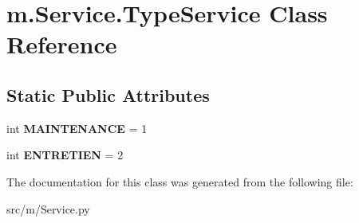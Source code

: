 \hypertarget{classm_1_1_service_1_1_type_service}{}\section{m.\+Service.\+Type\+Service Class Reference}
\label{classm_1_1_service_1_1_type_service}
\subsection*{Static Public Attributes}
\begin{DoxyCompactItemize}
\item 
\hypertarget{classm_1_1_service_1_1_type_service_a22b5cdd328cd557085510a3485ad9dfe}{}int {\bfseries M\+A\+I\+N\+T\+E\+N\+A\+N\+C\+E} = 1\label{classm_1_1_service_1_1_type_service_a22b5cdd328cd557085510a3485ad9dfe}

\item 
\hypertarget{classm_1_1_service_1_1_type_service_a5c69ccdca1fb327c59bc8c7bf628fa23}{}int {\bfseries E\+N\+T\+R\+E\+T\+I\+E\+N} = 2\label{classm_1_1_service_1_1_type_service_a5c69ccdca1fb327c59bc8c7bf628fa23}

\end{DoxyCompactItemize}


The documentation for this class was generated from the following file\+:\begin{DoxyCompactItemize}
\item 
src/m/Service.\+py\end{DoxyCompactItemize}
